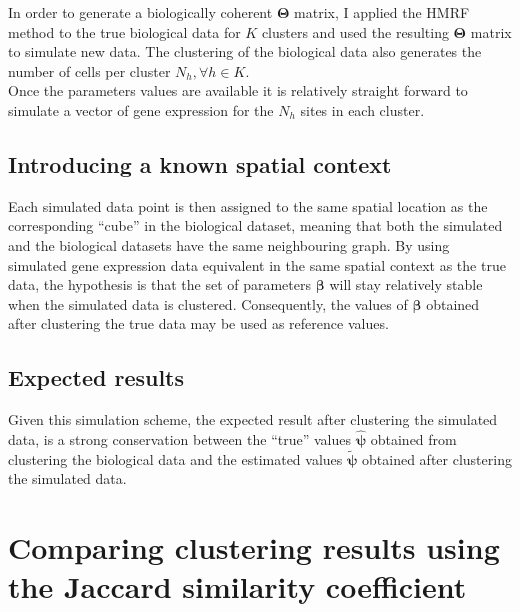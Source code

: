 	In order to generate a biologically coherent $\boldsymbol{\Theta}$ matrix, I applied the HMRF method to the true biological data for $K$ clusters and used the resulting $\boldsymbol{\Theta}$ matrix to simulate new data. The clustering of the biological data also generates the number of cells per cluster $N_h, \forall h \in K$.\\
	
	Once the parameters values are available it is relatively straight forward to simulate a vector of gene expression for the $N_h$ sites in each cluster.
	\subsection{Introducing a known spatial context}\label{subsec:simul_spatial}
	Each simulated data point is then assigned to the same spatial location as the corresponding ``cube'' in the biological dataset, meaning that both the simulated and the biological datasets have the same neighbouring graph. By using simulated gene expression data equivalent in the same spatial context as the true data, the hypothesis is that the set of parameters $\boldsymbol{\beta}$ will stay relatively stable when the simulated data is clustered. Consequently, the values of $\boldsymbol{\beta}$ obtained after clustering the true data may be used as reference values.
	\subsection{Expected results}\label{subsec:expected_simul_results}
	Given this simulation scheme, the expected result after clustering the simulated data, is a strong conservation between the ``true'' values $\hat{\boldsymbol{\psi}}$ obtained from clustering the biological data and the estimated values $\widetilde{\boldsymbol{\psi}}$ obtained after clustering the simulated data.\\

\section{Comparing clustering results using the Jaccard similarity coefficient}
